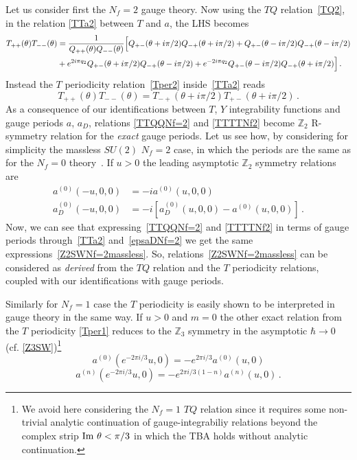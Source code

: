 \documentclass[11pt,a4paper]{elsarticle}
\def \th {\theta}
\def \ba {\begin{aligned}}
\def \ea {\end{aligned}}
\newcommand{\be}{\begin{equation}}
\newcommand{\ee}{\end{equation}}
\def\Im{{\rm Im ~}}
\def\th{\theta}
\numberwithin{figure}{section}
\numberwithin{table}{section}
\begin{document}
Let us consider first the $N_f=2$ gauge theory.
Now using the $TQ$ relation~\eqref{TQ2}, in the relation \eqref{TTa2} between $T$ and $a$, the LHS becomes
\be 
\ba\label{TTQQNf=2}
T_{++}(\theta)T_{--}(\theta)&=\frac{1}{Q_{++}(\theta)Q_{--}(\theta)}\Bigl[Q_{+-}(\theta+i\pi/2)Q_{-+}(\theta+i\pi/2)+Q_{+-}(\theta-i\pi/2)Q_{-+}(\theta-i\pi/2)\\&+e^{2i\pi q_{2}}Q_{+-}(\theta+i\pi/2)Q_{-+}(\theta-i\pi/2)+e^{-2i\pi q_{2}}Q_{+-}(\theta-i\pi/2)Q_{-+}(\theta+i\pi/2)\Bigr]\,.
\ea
\ee 
Instead the $T$ periodicity relation~\eqref{Tper2} 
inside~\eqref{TTa2} reads
\be  \label{TTTTNf2}
T_{++}(\th)T_{--}(\th) =T_{-+}(\th+i\pi/2)T_{+-}(\th+i\pi/2)\,.
\ee 
As a consequence of our identifications between $T$, $Y$ integrability functions and gauge periods $a$, $a_D$, relations \eqref{TTQQNf=2} and \eqref{TTTTNf2} become $\mathbb{Z}_2$ R-symmetry relation for the \emph{exact} gauge periods. Let us see how, by considering for simplicity the massless $SU(2)$ $N_f=2$ case, in which the periods are the same as for the $N_f=0$ theory~\cite{BilalFerrariQCD:1996}. If $u>0$ the leading asymptotic $\mathbb{Z}_2$ symmetry relations are
\be 
\ba \label{Z2SWNf=2massless}
a^{(0)}(-u,0,0)&= - ia^{(0)}(u,0,0)\\
a^{(0)}_D(-u,0,0)&= - i[a_D^{(0)}(u,0,0)-a^{(0)}(u,0,0)]\,.
\ea
\ee 
Now, we can see that expressing~\eqref{TTQQNf=2} and \eqref{TTTTNf2} in terms of gauge periods through~\eqref{TTa2} and~\eqref{epsaDNf=2} we get the same expressions~\eqref{Z2SWNf=2massless}. So, relations~\eqref{Z2SWNf=2massless} can be considered as \emph{derived} from the $TQ$ relation and the $T$ periodicity relations, coupled with our identifications with gauge periods. %




Similarly for $N_f=1$ case the $T$ periodicity is easily shown to be interpreted in gauge theory in the same way.
If $u>0$ and $m=0$ the other exact relation from the $T$ periodicity \eqref{Tper1} reduces to the $\mathbb{Z}_3$ symmetry in the asymptotic $\hbar \to 0$ (cf. \eqref{Z3SW})\footnote{We avoid here considering the $N_f=1$ $TQ $ relation since it requires some non-trivial analytic continuation of gauge-integrabiliy relations beyond the complex strip $\Im \th < \pi/3$ in which the TBA holds without analytic continuation.}
\be 
a^{(0)}(e^{-2\pi i/3}u,0) = - e^{2\pi i/3} a^{(0)}(u,0)
\ee
\be 
a^{(n)}(e^{-2\pi i/3}u,0) = - e^{2\pi i/3(1-n)} a^{(n)}(u,0)\,.
\ee 
\end{document}
